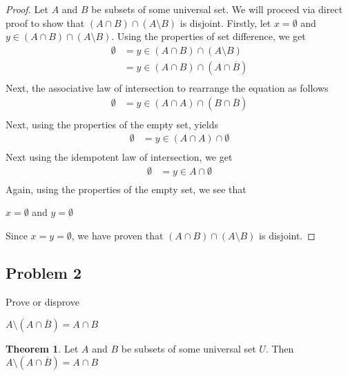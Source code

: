 \documentclass{book}
\theoremstyle{definition}
\newtheorem{theorem}{Theorem}[section]
\begin{document}
\begin{proof}
    Let $A$ and $B$ be subsets of some universal set. We will proceed via direct proof to show that $(A \cap B) \cap (A \setminus B)$ is disjoint. Firstly, let $x = \emptyset$ and $y \in (A \cap B) \cap (A \setminus B)$. Using the properties of set difference, we get
        \begin{align*}
            \emptyset & = y \in (A \cap B) \cap (A \setminus B) \\
                & = y \in (A \cap B) \cap (A \cap \overline{B}) \\
        \end{align*}
    Next, the associative law of intersection to rearrange the equation as follows
            \begin{align*}
            \emptyset & = y \in (A \cap A) \cap (B \cap \overline{B}) \\
        \end{align*}
    Next, using the properties of the empty set, yields
        \begin{align*}
            \emptyset & = y \in (A \cap A) \cap \emptyset \\
        \end{align*}
    Next using the idempotent law of intersection, we get
        \begin{align*}
            \emptyset & = y \in A \cap \emptyset \\
        \end{align*}
    Again, using the properties of the empty set, we see that 
        \begin{center}
            $x = \emptyset$ and $y = \emptyset$
        \end{center}
    Since $x = y = \emptyset$, we have proven that $(A \cap B) \cap (A \setminus B)$ is disjoint.  
\end{proof}


\newpage
\subsection{Problem 2}
Prove or disprove
    \begin{center}
        $A \setminus (A \cap \overline{B}) = A \cap B$
    \end{center}

\begin{tcolorbox}
	\begin{theorem}
		Let $A$ and $B$ be subsets of some universal set $U$. Then $A \setminus (A \cap \overline{B}) = A \cap B$
	\end{theorem}
\end{tcolorbox}
\end{document}
